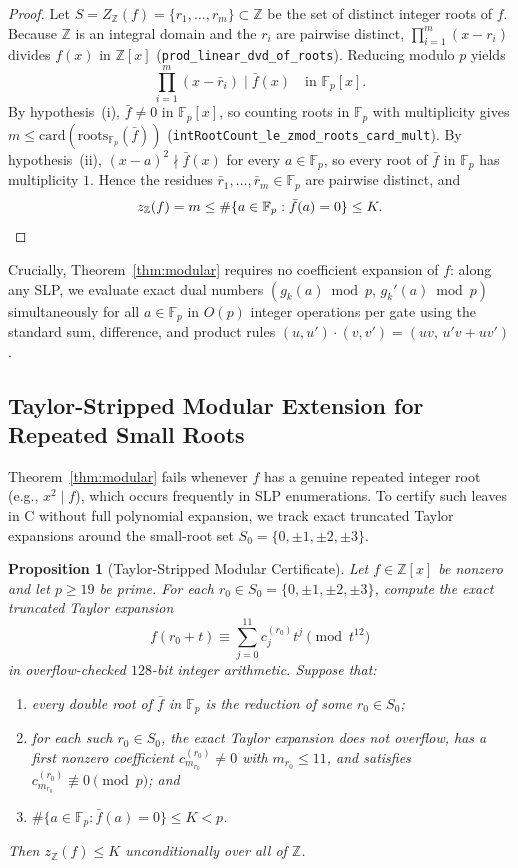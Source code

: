 \documentclass[11pt]{article}
\newtheorem{proposition}[theorem]{Proposition}
\newcommand{\Z}{\mathbb{Z}}
\newcommand{\F}{\mathbb{F}}
\newcommand{\code}[1]{\texttt{#1}}
\newcommand{\zZ}{z_{\Z}}
\begin{document}
\begin{proof}
Let $S = Z_{\Z}(f) = \{r_1, \dots, r_m\} \subset \Z$ be the set of distinct integer roots of $f$. Because $\Z$ is an integral domain and the $r_i$ are pairwise distinct, $\prod_{i=1}^m (x - r_i)$ divides $f(x)$ in $\Z[x]$ (\code{prod\_linear\_dvd\_of\_roots}). Reducing modulo $p$ yields
\[
  \prod_{i=1}^m (x - \bar{r}_i) \;\Big|\; \bar{f}(x) \quad \text{in } \F_p[x].
\]
By hypothesis~(i), $\bar{f} \neq 0$ in $\F_p[x]$, so counting roots in $\F_p$ with multiplicity gives $m \le \mathrm{card}(\mathrm{roots}_{\F_p}(\bar{f}))$ (\code{intRootCount\_le\_zmod\_roots\_card\_mult}). By hypothesis~(ii), $(x - a)^2 \nmid \bar{f}(x)$ for every $a \in \F_p$, so every root of $\bar{f}$ in $\F_p$ has multiplicity $1$. Hence the residues $\bar{r}_1, \dots, \bar{r}_m \in \F_p$ are pairwise distinct, and
\[
  \zZ(f) = m \le \#\{a \in \F_p : \bar{f}(a) = 0\} \le K. \qedhere
\]
\end{proof}

Crucially, Theorem~\ref{thm:modular} requires no coefficient expansion of $f$: along any SLP, we evaluate exact dual numbers $(g_k(a) \bmod p,\, g_k'(a) \bmod p)$ simultaneously for all $a \in \F_p$ in $O(p)$ integer operations per gate using the standard sum, difference, and product rules $(u, u') \cdot (v, v') = (uv,\, u'v + uv')$.

\subsection{Taylor-Stripped Modular Extension for Repeated Small Roots}
Theorem~\ref{thm:modular} fails whenever $f$ has a genuine repeated integer root (e.g., $x^2 \mid f$), which occurs frequently in SLP enumerations. To certify such leaves in C without full polynomial expansion, we track exact truncated Taylor expansions around the small-root set $S_0 = \{0, \pm 1, \pm 2, \pm 3\}$.

\begin{proposition}[Taylor-Stripped Modular Certificate]\label{prop:taylor}
Let $f \in \Z[x]$ be nonzero and let $p \ge 19$ be prime. For each $r_0 \in S_0 = \{0, \pm 1, \pm 2, \pm 3\}$, compute the exact truncated Taylor expansion
\[
  f(r_0 + t) \equiv \sum_{j=0}^{11} c_j^{(r_0)} t^j \pmod{t^{12}}
\]
in overflow-checked $128$-bit integer arithmetic. Suppose that:
\begin{enumerate}[label=(\roman*),leftmargin=1.8em]
  \item every double root of $\bar{f}$ in $\F_p$ is the reduction of some $r_0 \in S_0$;
  \item for each such $r_0 \in S_0$, the exact Taylor expansion does not overflow, has a first nonzero coefficient $c_{m_{r_0}}^{(r_0)} \neq 0$ with $m_{r_0} \le 11$, and satisfies $c_{m_{r_0}}^{(r_0)} \not\equiv 0 \pmod{p}$; and
  \item $\#\{a \in \F_p : \bar{f}(a) = 0\} \le K < p$.
\end{enumerate}
Then $\zZ(f) \le K$ unconditionally over all of $\Z$.
\end{proposition}
\end{document}
